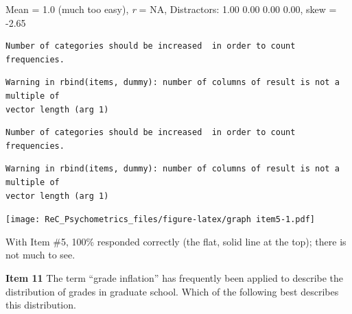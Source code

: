 \documentclass[
  english,
]{book}
\newenvironment{Shaded}{\begin{snugshade}}{\end{snugshade}}
\newcommand{\CommentTok}[1]{\textcolor[rgb]{0.56,0.35,0.01}{\textit{#1}}}
\newcommand{\DataTypeTok}[1]{\textcolor[rgb]{0.13,0.29,0.53}{#1}}
\newcommand{\DecValTok}[1]{\textcolor[rgb]{0.00,0.00,0.81}{#1}}
\newcommand{\KeywordTok}[1]{\textcolor[rgb]{0.13,0.29,0.53}{\textbf{#1}}}
\newcommand{\NormalTok}[1]{#1}
\newcommand{\OperatorTok}[1]{\textcolor[rgb]{0.81,0.36,0.00}{\textbf{#1}}}
\begin{document}
Mean = 1.0 (much too easy), \emph{r} = NA, Distractors: 1.00 0.00 0.00 0.00, skew = -2.65

\begin{Shaded}
\end{Shaded}

\begin{verbatim}
Number of categories should be increased  in order to count frequencies. 
\end{verbatim}

\begin{verbatim}
Warning in rbind(items, dummy): number of columns of result is not a multiple of
vector length (arg 1)
\end{verbatim}

\begin{verbatim}
Number of categories should be increased  in order to count frequencies. 
\end{verbatim}

\begin{verbatim}
Warning in rbind(items, dummy): number of columns of result is not a multiple of
vector length (arg 1)
\end{verbatim}

\texttt{[image: ReC\_Psychometrics\_files/figure-latex/graph item5-1.pdf]}

With Item \#5, 100\% responded correctly (the flat, solid line at the top); there is not much to see.

\textbf{Item 11} The term ``grade inflation'' has frequently been applied to describe the distribution of grades in graduate school. Which of the following best describes this distribution.
\end{document}

